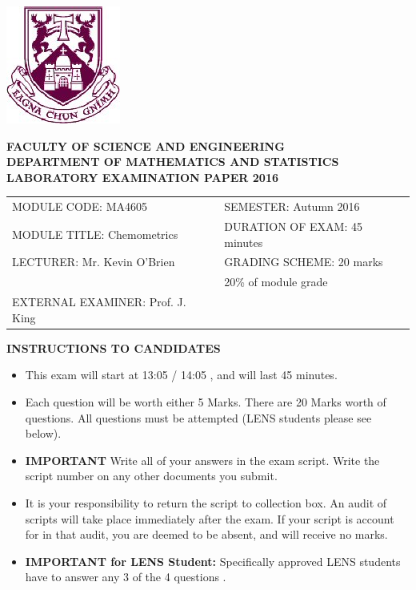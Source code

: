 \documentclass[a4paper,12pt]{article}
\begin{document}
\begin{center}
\includegraphics[scale=0.65]{images/shieldtransparent2}
\end{center}

\begin{center}
\vspace{1cm}
\large \bf {FACULTY OF SCIENCE AND ENGINEERING} \\[0.5cm]
\normalsize DEPARTMENT OF MATHEMATICS AND STATISTICS \\[1.25cm]
\large \bf {LABORATORY EXAMINATION PAPER 2016} \\[1.5cm]
\end{center}

\begin{tabular}{ll}
MODULE CODE: MA4605 & SEMESTER: Autumn 2016 \\[1cm]
MODULE TITLE: Chemometrics & DURATION OF EXAM: 45 minutes \\[1cm]
LECTURER: Mr. Kevin O'Brien & GRADING SCHEME: 20 marks \\
& \phantom{GRADING SCHEME:} \footnotesize {20\% of module grade} \\[0.8cm]
EXTERNAL EXAMINER: Prof. J. King & \\
\end{tabular}
\bigskip\begin{center}
	{\bf INSTRUCTIONS TO CANDIDATES}
\end{center}
\begin{itemize} 
	\item This exam will start at 13:05 / 14:05 , and will last 45 minutes.
	
	\item Each question will be worth either 5 Marks. There are 20 Marks worth of questions.
All questions must be attempted (LENS students please see below).
	
	\item \textbf{IMPORTANT }Write all of your answers in the exam script. Write the script number on any other documents you submit.
	
	\item It is your responsibility to return the script to collection box. An audit of scripts will take place immediately after the exam. If your script is account for in that audit,  you are deemed to be absent, and will receive no marks.
	
	\item \textbf{IMPORTANT for LENS Student:}
	Specifically approved LENS students have to answer any 3 of the 4 questions .
	\end{itemize}
\newpage
\end{document}
